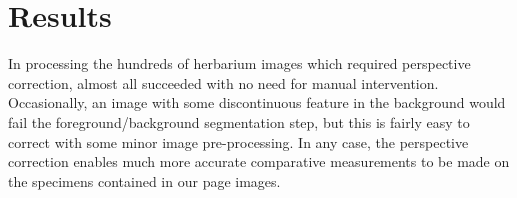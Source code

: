 \documentclass[a4paper]{llncs}
\begin{document}
\section{Results}

In processing the hundreds of herbarium images which required perspective correction, almost all succeeded
with no need for manual intervention. Occasionally, an image with some discontinuous feature in the background
would fail the foreground/background segmentation step, but this is fairly easy to correct with some minor
image pre-processing. In any case, the perspective correction enables much more accurate comparative measurements
to be made on the specimens contained in our page images.

\begin{figure}[h!tbm]
  \centering


\end{figure}
\end{document}
